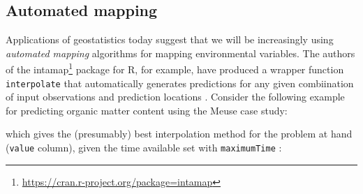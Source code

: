 \documentclass[11pt]{krantz}
\newenvironment{Shaded}{\begin{snugshade}}{\end{snugshade}}
\newcommand{\CommentTok}[1]{\textcolor[rgb]{0.37,0.37,0.37}{\textit{#1}}}
\newcommand{\DataTypeTok}[1]{\textcolor[rgb]{0.27,0.27,0.27}{#1}}
\newcommand{\KeywordTok}[1]{\textcolor[rgb]{0.27,0.27,0.27}{\textbf{#1}}}
\newcommand{\NormalTok}[1]{#1}
\newcommand{\OperatorTok}[1]{\textcolor[rgb]{0.43,0.43,0.43}{\textbf{#1}}}
\newcommand{\OtherTok}[1]{\textcolor[rgb]{0.37,0.37,0.37}{#1}}
\newcommand{\StringTok}[1]{\textcolor[rgb]{0.5,0.5,0.5}{#1}}
\renewcommand{\href}[2]{#2\footnote{\url{#1}}}
\theoremstyle{definition}
\theoremstyle{definition}
\theoremstyle{definition}
\theoremstyle{remark}
\begin{document}
\hypertarget{automated-mapping}{%
\subsection{Automated mapping}\label{automated-mapping}}

Applications of geostatistics today suggest that we will be increasingly
using \emph{automated mapping} algorithms for mapping environmental
variables. The authors of the
\href{https://cran.r-project.org/package=intamap}{intamap} package for
R, for example, have produced a wrapper function \texttt{interpolate}
that automatically generates predictions for any given combiination of
input observations and prediction locations
\citep{Pebesma2011CompGeoSci}. Consider the following example for
predicting organic matter content using the Meuse case study:

\begin{Shaded}
\end{Shaded}

which gives the (presumably) best interpolation method for the problem
at hand (\texttt{value} column), given the time available set with
\texttt{maximumTime} \citep{Pebesma2011CompGeoSci}:
\end{document}
